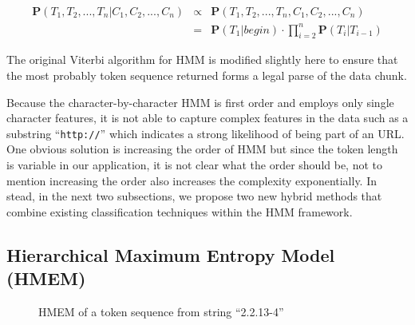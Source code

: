 \begin{eqnarray*}
\mathbf{P}(T_1, T_2, ..., T_n|C_1, C_2, ..., C_n) & \propto & \mathbf{P}(T_1, T_2, ..., T_n, C_1, C_2, ..., C_n)\\
& = & \mathbf{P}(T_1|begin) \cdot
\prod_{i=2}^{n}{\mathbf{P}(T_i|T_{i-1})}
\end{eqnarray*}


The original Viterbi algorithm for HMM is modified slightly here 
to ensure that the most probably token sequence returned forms a legal
parse of the data chunk. 

Because the character-by-character HMM is first order and employs only 
single character features, it is not able to capture complex features
in the data such as  
a substring ``{\tt http://}'' which indicates a strong likelihood 
of being part of an URL.
One obvious solution is
increasing the order of HMM but since the token length is variable in
our application, it is not clear what the order should be, not to mention
increasing the order also increases the complexity exponentially. 
In stead, in the next two subsections, we propose two new hybrid
methods that combine existing classification techniques within the
HMM framework.

\subsection{Hierarchical Maximum Entropy Model (HMEM)}\label{subsec:hmem}

\begin{figure}[th]
\begin{center}
\end{center}
\caption{HMEM of a token sequence from string ``2.2.13-4''}\label{fig:hmem}
\end{figure}

